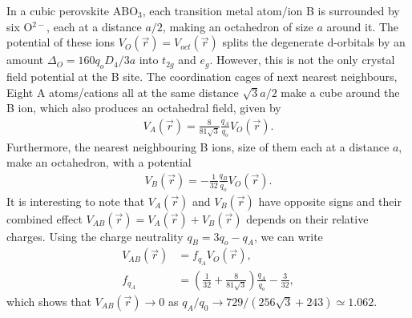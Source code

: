 \documentclass[a4paper,prb]{revtex4-1}  %
\begin{document}
In a cubic perovskite ABO$_3$,
each transition metal atom/ion B
is surrounded by six O$^{2-}$, each at a distance $a/2$,
 making an octahedron of size $a$ around it.
The potential of these ions $V_{O}(\vec r)= V_{oct}(\vec r)$
splits the degenerate d-orbitals
by an amount ${\Delta_O=160q_oD_{4}/3a}$
 into $t_{2g}$ and $e_g$.
However, this is not the only crystal field potential at the B site.
The coordination cages of next nearest neighbours, 
Eight A atoms/cations all at the same distance $\sqrt{3}a/2$
make a cube around the B ion,
which also produces an octahedral field, given by 
\begin{align}
V_{A}(\vec r) = \frac{8}{81 \sqrt{3}}\frac{q_A}{q_o} V_{O}(\vec r).
\end{align}
Furthermore,
the nearest neighbouring B ions, size of them each at a distance $a$,
make an octahedron, with a potential 
\begin{align}
V_{B}(\vec r) = -\frac{1}{32}\frac{q_B}{q_o}V_{O}(\vec r).
\end{align}
It is interesting to note that 
$V_{A}(\vec r)$ and $V_{B}(\vec r)$ have opposite signs
and 
their combined effect 
$V_{AB}(\vec r) = V_{A}(\vec r)+ V_{B}(\vec r)$
depends on their relative charges.
Using the charge neutrality $q_B=3q_o-q_A$,
we can write 
\begin{align}
V_{AB}(\vec r) &= f_{q_A}V_{O}(\vec r),\\
f_{q_A} &= \left(\frac{1}{32}+\frac{8}{81 \sqrt{3}}\right)\frac{q_A}{q_o} -\frac{3}{32},
\end{align}
which shows that $V_{AB}(\vec r)\to 0$
as
${q_A/q_0\to 729/({256 \sqrt{3}+243})\simeq 1.062}$.
\end{document}
